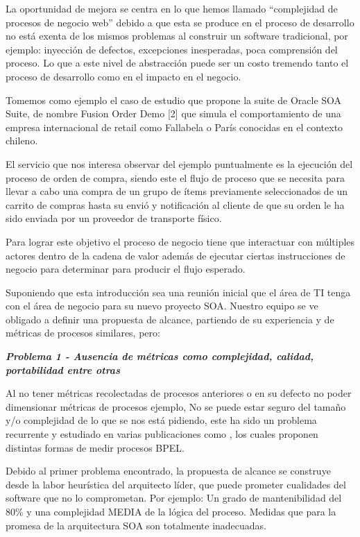 \documentclass[spanish]{article}
\begin{document}
La oportunidad de mejora se centra en lo que hemos llamado ``complejidad
de procesos de negocio web” debido a que esta se produce en el proceso
de desarrollo no está exenta de los mismos problemas al construir
un software tradicional, por ejemplo: inyección de defectos, excepciones
inesperadas, poca comprensión del proceso. Lo que a este nivel de
abstracción puede ser un costo tremendo tanto el proceso de desarrollo
como en el impacto en el negocio.

Tomemos como ejemplo el caso de estudio que propone la suite de Oracle
SOA Suite, de nombre Fusion Order Demo {[}2{]} que simula el comportamiento
de una empresa internacional de retail como Fallabela o París conocidas
en el contexto chileno.

El servicio que nos interesa observar del ejemplo puntualmente es
la ejecución del proceso de orden de compra, siendo este el flujo
de proceso que se necesita para llevar a cabo una compra de un grupo
de ítems previamente seleccionados de un carrito de compras hasta
su envió y notificación al cliente de que su orden le ha sido enviada
por un proveedor de transporte físico.

Para lograr este objetivo el proceso de negocio tiene que interactuar
con múltiples actores dentro de la cadena de valor además de ejecutar
ciertas instrucciones de negocio para determinar para producir el
flujo esperado.

Suponiendo que esta introducción sea una reunión inicial que el área
de TI tenga con el área de negocio para su nuevo proyecto SOA. Nuestro
equipo se ve obligado a definir una propuesta de alcance, partiendo
de su experiencia y de métricas de procesos similares, pero:

\textbf{\emph{Problema 1 - Ausencia de métricas como complejidad,
calidad, portabilidad entre otras}}

Al no tener métricas recolectadas de procesos anteriores o en su defecto
no poder dimensionar métricas de procesos ejemplo, No se puede estar
seguro del tamaño y/o complejidad de lo que se nos está pidiendo,
este ha sido un problema recurrente y estudiado en varias publicaciones
como \cite{Cardoso2008,Cardoso2006,Budnik2011}, los cuales proponen
distintas formas de medir procesos BPEL.

Debido al primer problema encontrado, la propuesta de alcance se construye
desde la labor heurística del arquitecto líder, que puede prometer
cualidades del software que no lo comprometan. Por ejemplo: Un grado
de mantenibilidad del 80\% y una complejidad MEDIA de la lógica del
proceso. Medidas que para la promesa de la arquitectura SOA son totalmente
inadecuadas.
\end{document}
